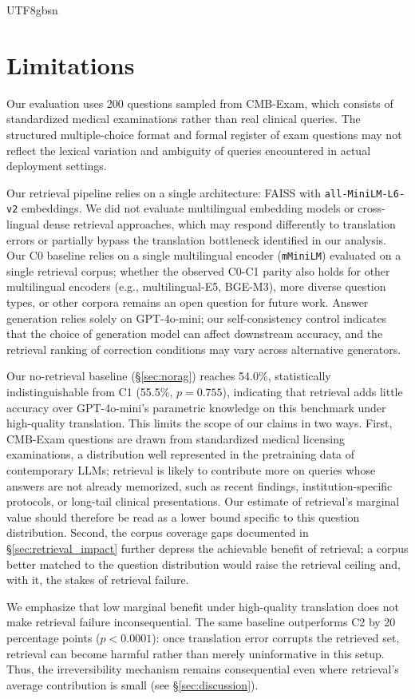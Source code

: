\documentclass[11pt]{article}
\begin{document}
\begin{CJK}{UTF8}{gbsn}
\section*{Limitations}
Our evaluation uses 200 questions sampled from CMB-Exam, which consists of standardized medical examinations rather than real clinical queries. The structured multiple-choice format and formal register of exam questions may not reflect the lexical variation and ambiguity of queries encountered in actual deployment settings.

Our retrieval pipeline relies on a single architecture: FAISS with \texttt{all-MiniLM-L6-v2} embeddings. We did not evaluate multilingual embedding models or cross-lingual dense retrieval approaches, which may respond differently to translation errors or partially bypass the translation bottleneck identified in our analysis. Our C0 baseline relies on a single multilingual encoder (\texttt{mMiniLM}) evaluated on a single retrieval corpus; whether the observed C0-C1 parity also holds for other multilingual encoders (e.g., multilingual-E5, BGE-M3), more diverse question types, or other corpora remains an open question for future work. Answer generation relies solely on GPT-4o-mini; our self-consistency control indicates that the choice of generation model can affect downstream accuracy, and the retrieval ranking of correction conditions may vary across alternative generators.

Our no-retrieval baseline (\S\ref{sec:norag}) reaches 54.0\%, statistically indistinguishable from C1 (55.5\%, $p = 0.755$), indicating that retrieval adds little accuracy over GPT-4o-mini's parametric knowledge on this benchmark under high-quality translation. This limits the scope of our claims in two ways. First, CMB-Exam questions are drawn from standardized medical licensing examinations, a distribution well represented in the pretraining data of contemporary LLMs; retrieval is likely to contribute more on queries whose answers are not already memorized, such as recent findings, institution-specific protocols, or long-tail clinical presentations. Our estimate of retrieval's marginal value should therefore be read as a lower bound specific to this question distribution. Second, the corpus coverage gaps documented in \S\ref{sec:retrieval_impact} further depress the achievable benefit of retrieval; a corpus better matched to the question distribution would raise the retrieval ceiling and, with it, the stakes of retrieval failure.

We emphasize that low marginal benefit under high-quality translation does not make retrieval failure inconsequential. The same baseline outperforms C2 by 20 percentage points ($p < 0.0001$): once translation error corrupts the retrieved set, retrieval can become harmful rather than merely uninformative in this setup. Thus, the irreversibility mechanism remains consequential even where retrieval's average contribution is small (see \S\ref{sec:discussion}).


\end{CJK}
\end{document}
